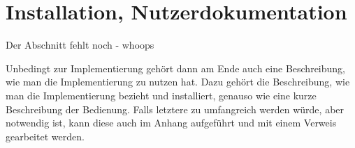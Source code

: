 \section{Installation, Nutzerdokumentation}

Der Abschnitt fehlt noch - whoops 

Unbedingt zur Implementierung gehört dann am Ende auch eine Beschreibung, wie man die Implementierung zu nutzen hat. Dazu gehört die Beschreibung, wie man die Implementierung bezieht und installiert, genauso wie eine kurze Beschreibung der Bedienung. Falls letztere zu umfangreich werden würde, aber notwendig ist, kann diese auch im Anhang aufgeführt und mit einem Verweis gearbeitet werden.
